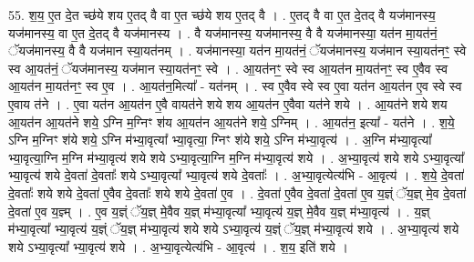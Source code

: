 \documentclass[17pt]{extarticle}
\begin{document}
55. श॒य॒ ए॒त दे॒त च्छ॑ये शय ए॒तद् वै वा ए॒त च्छ॑ये शय ए॒तद् वै । . ए॒तद् वै वा ए॒त दे॒तद् वै यज॑मानस्य॒ यज॑मानस्य॒ वा ए॒त दे॒तद् वै यज॑मानस्य । . वै यज॑मानस्य॒ यज॑मानस्य॒ वै वै यज॑मानस्या॒ यत॑न मा॒यत॑नं॒ ॅयज॑मानस्य॒ वै वै यज॑मान स्या॒यत॑नम् । . यज॑मानस्या॒ यत॑न मा॒यत॑नं॒ ॅयज॑मानस्य॒ यज॑मान स्या॒यत॑नꣳ॒॒ स्वे स्व आ॒यत॑नं॒ ॅयज॑मानस्य॒ यज॑मान स्या॒यत॑नꣳ॒॒ स्वे । . आ॒यत॑नꣳ॒॒ स्वे स्व आ॒यत॑न मा॒यत॑नꣳ॒॒ स्व ए॒वैव स्व आ॒यत॑न मा॒यत॑नꣳ॒॒ स्व ए॒व । . आ॒यत॑न॒मित्या᳚ - यत॑नम् । . स्व ए॒वैव स्वे स्व ए॒वा यत॑न आ॒यत॑न ए॒व स्वे स्व ए॒वाय त॑ने । . ए॒वा यत॑न आ॒यत॑न ए॒वै वायत॑ने शये शय आ॒यत॑न ए॒वैवा यत॑ने शये । . आ॒यत॑ने शये शय आ॒यत॑न आ॒यत॑ने शये॒ ऽग्नि म॒ग्निꣳ श॑य आ॒यत॑न आ॒यत॑ने शये॒ ऽग्निम् । . आ॒यत॑न॒ इत्या᳚ - यत॑ने । . श॒ये॒ ऽग्नि म॒ग्निꣳ श॑ये शये॒ ऽग्नि म॑भ्या॒वृत्या᳚ भ्या॒वृत्या॒ ग्निꣳ श॑ये शये॒ ऽग्नि म॑भ्या॒वृत्य॑ । . अ॒ग्नि म॑भ्या॒वृत्या᳚ भ्या॒वृत्या॒ग्नि म॒ग्नि म॑भ्या॒वृत्य॑ शये शये ऽभ्या॒वृत्या॒ग्नि म॒ग्नि म॑भ्या॒वृत्य॑ शये । . अ॒भ्या॒वृत्य॑ शये शये ऽभ्या॒वृत्या᳚ भ्या॒वृत्य॑ शये दे॒वता॑ दे॒वताः᳚ शये ऽभ्या॒वृत्या᳚ भ्या॒वृत्य॑ शये दे॒वताः᳚ । . अ॒भ्या॒वृत्येत्य॑भि - आ॒वृत्य॑ । . श॒ये॒ दे॒वता॑ दे॒वताः᳚ शये शये दे॒वता॑ ए॒वैव दे॒वताः᳚ शये शये दे॒वता॑ ए॒व । . दे॒वता॑ ए॒वैव दे॒वता॑ दे॒वता॑ ए॒व य॒ज्ञ्ं ॅय॒ज्ञ् मे॒व दे॒वता॑ दे॒वता॑ ए॒व य॒ज्ञ्म् । . ए॒व य॒ज्ञ्ं ॅय॒ज्ञ् मे॒वैव य॒ज्ञ् म॑भ्या॒वृत्या᳚ भ्या॒वृत्य॑ य॒ज्ञ् मे॒वैव य॒ज्ञ् म॑भ्या॒वृत्य॑ । . य॒ज्ञ् म॑भ्या॒वृत्या᳚ भ्या॒वृत्य॑ य॒ज्ञ्ं ॅय॒ज्ञ् म॑भ्या॒वृत्य॑ शये शये ऽभ्या॒वृत्य॑ य॒ज्ञ्ं ॅय॒ज्ञ् म॑भ्या॒वृत्य॑ शये । . अ॒भ्या॒वृत्य॑ शये शये ऽभ्या॒वृत्या᳚ भ्या॒वृत्य॑ शये । . अ॒भ्या॒वृत्येत्य॑भि - आ॒वृत्य॑ । . श॒य॒ इति॑ शये । \newline
\pagebreak
{}
\end{document}
